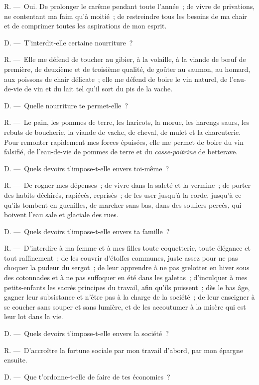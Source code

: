 \documentclass[french,twoside]{book} %
\begin{document}
R. — Oui. De prolonger le carême pendant toute l’année ; de vivre de privations, ne contentant ma faim qu’à moitié ; de restreindre tous les besoins de ma chair et de comprimer toutes les aspirations de mon esprit.\par
D. — T'interdit-elle certaine nourriture ?\par
R. — Elle me défend de toucher au gibier, à la volaille, à la viande de bœuf de première, de deuxième et de troisième qualité, de goûter au saumon, au homard, aux poissons de chair délicate ; elle me défend de boire le vin naturel, de l’eau-de-vie de vin et du lait tel qu’il sort du pis de la vache.\par
D. — Quelle nourriture te permet-elle ?\par
R. — Le pain, les pommes de terre, les haricots, la morue, les harengs saurs, les rebuts de boucherie, la viande de vache, de cheval, de mulet et la charcuterie. Pour remonter rapidement mes forces épuisées, elle me permet de boire du vin falsifié, de l’eau-de-vie de pommes de terre et du \emph{casse-poitrine} de betterave.\par
D. — Quels devoirs t’impose-t-elle envers toi-même ?\par
R. — De rogner mes dépenses ; de vivre dans la saleté et la vermine ; de porter des habits déchirés, rapiécés, reprisés ; de les user jusqu’à la corde, jusqu’à ce qu’ils tombent en guenilles, de marcher sans bas, dans des souliers percés, qui boivent l’eau sale et glaciale des rues.\par
D. — Quels devoirs t’impose-t-elle envers ta famille ?\par
R. — D'interdire à ma femme et à mes filles toute coquetterie, toute élégance et tout raffinement ; de les couvrir d’étoffes communes, juste assez pour ne pas choquer la pudeur du sergot ; de leur apprendre à ne pas grelotter en hiver sous des cotonnades et à ne pas suffoquer en été dans les galetas ; d’inculquer à mes petits-enfants les sacrés principes du travail, afin qu’ils puissent ; dès le bas âge, gagner leur subsistance et n’être pas à la charge de la société ; de leur enseigner à se coucher sans souper et sans lumière, et de les accoutumer à la misère qui est leur lot dans la vie.\par
D. — Quels devoirs t’impose-t-elle envers la société ?\par
R. — D'accroître la fortune sociale par mon travail d’abord, par mon épargne ensuite.\par
D. — Que t’ordonne-t-elle de faire de tes économies ?\par
\end{document}
